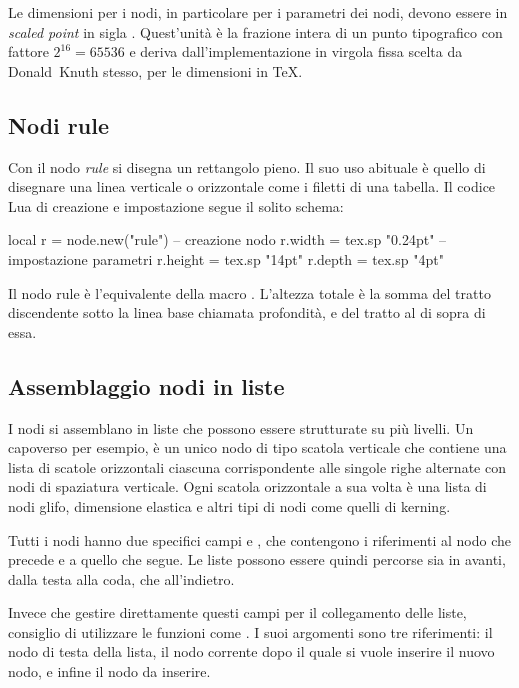Le dimensioni per i nodi, in particolare per i parametri dei nodi, devono essere
in \emph{scaled point} in sigla . Quest'unità è la frazione intera di un
punto tipografico con fattore \( 2^{16} = 65536 \) e deriva
dall'implementazione in virgola fissa scelta da Donald~Knuth stesso, per le
dimensioni in \TeX.


\subsection{Nodi rule}

Con il nodo \emph{rule} si disegna un rettangolo pieno. Il suo uso abituale è
quello di disegnare una linea verticale o orizzontale come i filetti di una
tabella. Il codice Lua di creazione e impostazione segue il solito schema:
\begin{lines}
local r = node.new("rule") -- creazione nodo
r.width = tex.sp "0.24pt"  -- impostazione parametri
r.height = tex.sp "14pt"
r.depth = tex.sp "4pt"
\end{lines}

Il nodo rule è l'equivalente della macro . L'altezza totale è la somma
del tratto discendente sotto la linea base chiamata profondità, e del tratto al
di sopra di essa.


\subsection{Assemblaggio nodi in liste}

I nodi si assemblano in liste che possono essere strutturate su più livelli. Un
capoverso per esempio, è un unico nodo di tipo scatola verticale che contiene
una lista di scatole orizzontali ciascuna corrispondente alle singole righe
alternate con nodi di spaziatura verticale. Ogni scatola orizzontale a sua volta
è una lista di nodi glifo, dimensione elastica e altri tipi di nodi come quelli
di kerning.

Tutti i nodi hanno due specifici campi  e , che contengono
i riferimenti al nodo che precede e a quello che segue. Le liste possono essere
quindi percorse sia in avanti, dalla testa alla coda, che all'indietro.

Invece che gestire direttamente questi campi per il collegamento delle liste,
consiglio di utilizzare le funzioni come
. I suoi argomenti sono tre
riferimenti: il nodo di testa della lista, il nodo corrente dopo il quale si
vuole inserire il nuovo nodo, e infine il nodo da inserire.


